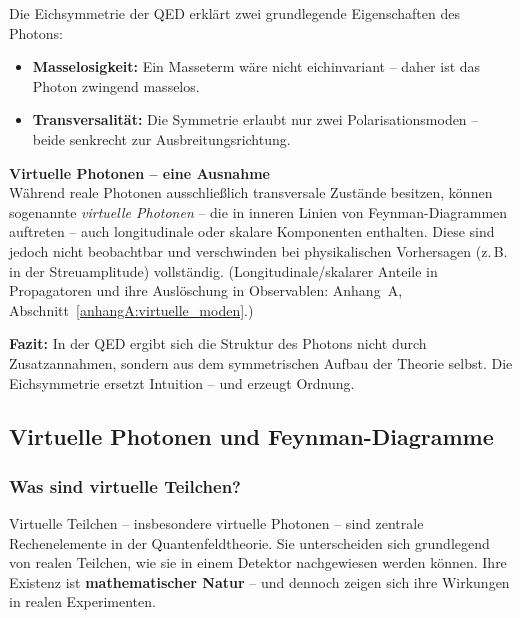 \vspace{1em}
\begin{tcolorbox}[physikbox, title=Folgen der Eichsymmetrie]
	\label{box:folgen der Eichsy}
	\small
	Die Eichsymmetrie der QED erklärt zwei grundlegende Eigenschaften des Photons:
	
	\begin{itemize}
		\item \textbf{Masselosigkeit:} Ein Masseterm wäre nicht eichinvariant – daher ist das Photon zwingend masselos.
		\item \textbf{Transversalität:} Die Symmetrie erlaubt nur zwei Polarisationsmoden – beide senkrecht zur Ausbreitungsrichtung.
	\end{itemize}
\end{tcolorbox}
\vspace{1em}
\textbf{Virtuelle Photonen – eine Ausnahme}\\
Während reale Photonen ausschließlich transversale Zustände besitzen, können sogenannte \emph{virtuelle Photonen} – die in inneren Linien von Feynman-Diagrammen auftreten – auch longitudinale oder skalare Komponenten enthalten.
Diese sind jedoch nicht beobachtbar und verschwinden bei physikalischen Vorhersagen (z.\,B. in der Streuamplitude) vollständig.
(Longitudinale/skalarer Anteile in Propagatoren und ihre Auslöschung in Observablen: Anhang~A, Abschnitt~\ref{anhangA:virtuelle_moden}.)

\textbf{Fazit:}
In der QED ergibt sich die Struktur des Photons nicht durch Zusatzannahmen, sondern aus dem symmetrischen Aufbau der Theorie selbst. Die Eichsymmetrie ersetzt Intuition – und erzeugt Ordnung.

\subsection{Virtuelle Photonen und Feynman-Diagramme}

\subsubsection{Was sind virtuelle Teilchen?}

Virtuelle Teilchen – insbesondere virtuelle Photonen – sind zentrale Rechenelemente in der Quantenfeldtheorie.
Sie unterscheiden sich grundlegend von realen Teilchen, wie sie in einem Detektor nachgewiesen werden können.
Ihre Existenz ist \textbf{mathematischer Natur} – und dennoch zeigen sich ihre Wirkungen in realen Experimenten.

